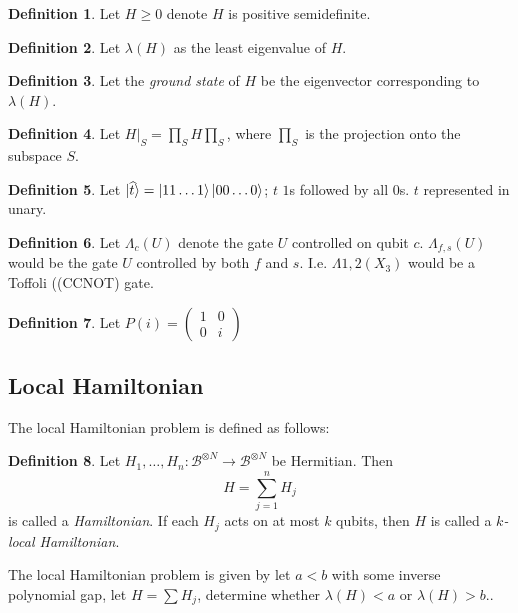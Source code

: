 \documentclass{article}
\theoremstyle{definition}
\newtheorem{definition}{Definition}[section]
\begin{document}
\begin{definition}
	Let $H\geq0$ denote $H$ is positive semidefinite.
\end{definition}

\begin{definition}
	Let $\lambda(H)$ as the least eigenvalue of $H$.
\end{definition}

\begin{definition}
	Let the \emph{ground state} of $H$ be the eigenvector corresponding to $\lambda(H)$.
\end{definition}

\begin{definition}
	Let $H\big|_S=\prod_SH\prod_S$, where $\prod_S$ is the projection onto the subspace $S$.
\end{definition}

\begin{definition}
	Let $\ket{\widehat{t}}=\ket{11\ldots1} \ket{00\ldots0}$; $t$ $1$s followed by all $0$s. $t$ represented in unary.
\end{definition}

\begin{definition}
	Let $\Lambda_c(U)$ denote the gate $U$ controlled on qubit $c$. $\Lambda_{f, s}(U)$ would be the gate $U$ controlled by both $f$ and $s$. I.e. $\Lambda{1, 2}(X_3)$ would be a Toffoli ((CCNOT) gate.
\end{definition}

\begin{definition}
	Let $P(i)=\begin{pmatrix}1&0\\0&i\end{pmatrix}$
\end{definition}

\subsection{Local Hamiltonian}

The local Hamiltonian problem is defined as follows:

\begin{definition}
	Let $H_1, \ldots, H_n:\mathcal{B}^{\otimes N}\rightarrow\mathcal{B}^{\otimes N}$ be Hermitian. Then $$H=\sum_{j=1}^nH_j$$ is called a \emph{Hamiltonian}.
	If each $H_j$ acts on at most $k$ qubits, then $H$ is called a \emph{$k$-local Hamiltonian}.
\end{definition}

The local Hamiltonian problem is given by let $a<b$ with some inverse polynomial gap, let $H=\sum H_j$, determine whether $\lambda(H)<a$ or $\lambda(H)>b$..
\end{document}
